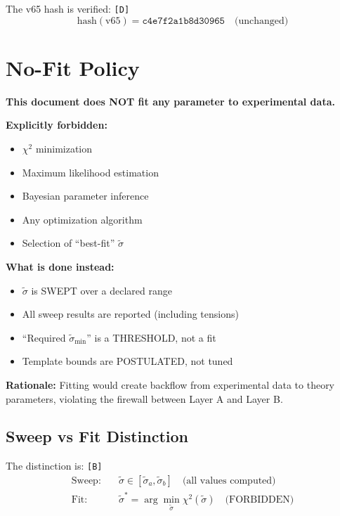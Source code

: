 \documentclass[11pt,a4paper]{article}
\newcommand{\tagD}{\textcolor{green!50!black}{\texttt{[D]}}}
\newcommand{\tagB}{\textcolor{purple!70!black}{\texttt{[B]}}}
\theoremstyle{definition}
\begin{document}
The v65 hash is verified: \tagD{}
\begin{equation}
\label{eq:hash-verify}
\text{hash}(\text{v65}) = \texttt{c4e7f2a1b8d30965} \quad \text{(unchanged)}
\end{equation}

\section{No-Fit Policy}
\label{sec:no-fit}

\begin{nofitbox}
\textbf{This document does NOT fit any parameter to experimental data.}

\textbf{Explicitly forbidden:}
\begin{itemize}
  \item $\chi^2$ minimization
  \item Maximum likelihood estimation
  \item Bayesian parameter inference
  \item Any optimization algorithm
  \item Selection of ``best-fit'' $\tilde{\sigma}$
\end{itemize}

\textbf{What is done instead:}
\begin{itemize}
  \item $\tilde{\sigma}$ is SWEPT over a declared range
  \item All sweep results are reported (including tensions)
  \item ``Required $\tilde{\sigma}_{\min}$'' is a THRESHOLD, not a fit
  \item Template bounds are POSTULATED, not tuned
\end{itemize}

\textbf{Rationale:}
Fitting would create backflow from experimental data to theory parameters,
violating the firewall between Layer A and Layer B.
\end{nofitbox}

\subsection{Sweep vs Fit Distinction}
\label{subsec:sweep-vs-fit}

The distinction is: \tagB{}
\begin{align}
\label{eq:sweep-def}
\text{Sweep:} \quad &\tilde{\sigma} \in [\tilde{\sigma}_a, \tilde{\sigma}_b] \quad \text{(all values computed)} \\
\label{eq:fit-def}
\text{Fit:} \quad &\tilde{\sigma}^* = \arg\min_{\tilde{\sigma}} \chi^2(\tilde{\sigma}) \quad \text{(FORBIDDEN)}
\end{align}
\end{document}
